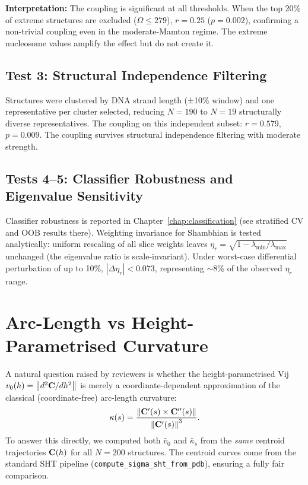 \textbf{Interpretation:} The coupling is significant at all thresholds. When the top 20\% of extreme structures are excluded ($\Omega \leq 279$), $r = 0.25$ ($p = 0.002$), confirming a non-trivial coupling even in the moderate-Mamton regime. The extreme nucleosome values amplify the effect but do not create it.

\subsection{Test 3: Structural Independence Filtering}

Structures were clustered by DNA strand length (±10\% window) and one representative per cluster selected, reducing $N = 190$ to $N = 19$ structurally diverse representatives. The coupling on this independent subset: $r = 0.579$, $p = 0.009$. The coupling survives structural independence filtering with moderate strength.

\subsection{Tests 4--5: Classifier Robustness and Eigenvalue Sensitivity}

Classifier robustness is reported in Chapter~\ref{chap:classification} (see stratified CV and OOB results there). Weighting invariance for Shambhian is tested analytically: uniform rescaling of all slice weights leaves $\eta_r = \sqrt{1 - \lambda_{\min}/\lambda_{\max}}$ unchanged (the eigenvalue ratio is scale-invariant). Under worst-case differential perturbation of up to 10\%, $|\Delta\eta_r| < 0.073$, representing $\sim$8\% of the observed $\eta_r$ range.

\section{Arc-Length vs Height-Parametrised Curvature}
\label{sec:arclength_comparison}

A natural question raised by reviewers is whether the height-parametrised Vij $v_0(h) = \left\lVert d^2\mathbf{C}/dh^2\right\rVert$ is merely a coordinate-dependent approximation of the classical (coordinate-free) arc-length curvature:
\begin{equation}
    \kappa(s) = \frac{\left\lVert\mathbf{C}'(s) \times \mathbf{C}''(s)\right\rVert}{\left\lVert\mathbf{C}'(s)\right\rVert^3}.
\end{equation}
To answer this directly, we computed both $\bar{v}_0$ and $\bar{\kappa}_s$ from the \emph{same} centroid trajectories $\mathbf{C}(h)$ for all $N = 200$ structures. The centroid curves come from the standard SHT pipeline (\texttt{compute\_sigma\_sht\_from\_pdb}), ensuring a fully fair comparison.

